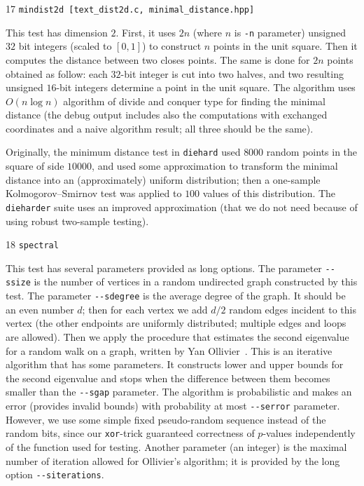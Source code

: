 \documentclass[12pt,a4paper,fullpage]{article}
\begin{document}
\begin{description}
\item{17} \texttt{mindist2d [text\_dist2d.c, minimal\_distance.hpp]}

This test has dimension $2$. First, it uses $2n$ (where $n$ is \texttt{-n} parameter) unsigned $32$ bit integers (scaled to $[0,1]$) to construct $n$ points in the unit square. Then it computes the distance between two closes points. The same is done for $2n$ points obtained as follow: each $32$-bit integer is cut into two halves, and two resulting unsigned $16$-bit integers determine a point in the unit square. The algorithm uses $O(n\log n)$ algorithm of divide and conquer type for finding the minimal distance (the debug output includes also the computations with exchanged coordinates and a naive algorithm result; all three should be the same).

Originally, the minimum distance test in \texttt{diehard} used $8000$ random points in the square of side $10000$, and used some approximation to transform the minimal distance into an (approximately) uniform distribution; then a one-sample Kolmogorov--Smirnov test was applied to $100$ values of this distribution. The \texttt{dieharder} suite uses an improved approximation (that we do not need because of using robust two-sample testing).

\item{18} \texttt{spectral}

This test has several parameters provided as long options. The parameter \hbox{\texttt{{-}-ssize}} is the number of vertices in a random undirected graph constructed by this test. The parameter \texttt{{-}-sdegree} is the average degree of the graph. It should be an even number $d$; then for each vertex we add $d/2$ random edges incident to this vertex (the other endpoints are uniformly distributed; multiple edges and loops are allowed). Then we apply the procedure that estimates the second eigenvalue for a random walk on a graph, written by Yan Ollivier~\cite{ollivier}. This is an iterative algorithm that has some parameters. It constructs lower and upper bounds for the second eigenvalue and stops when the difference between them becomes smaller than the \texttt{{-}-sgap} parameter. The algorithm is probabilistic and makes an error (provides invalid bounds) with probability at most \texttt{{-}-serror} parameter. However, we use some simple fixed pseudo-random sequence instead of the random bits, since our \texttt{xor}-trick guaranteed correctness of $p$-values independently of the function used for testing. Another parameter (an integer) is the maximal number of iteration allowed for Ollivier's algorithm; it is provided by the long option \texttt{{-}-siterations}. 


\end{description}
\end{document}
